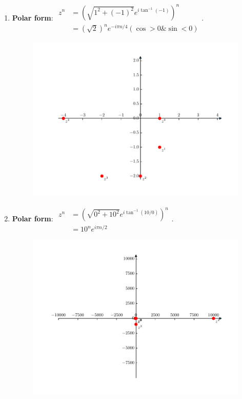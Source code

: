 \begin{homeworkProblem}
\begin{multicols}{2}
\begin{enumerate}
    \item \textbf{Polar form}:
    $\begin{aligned}
        z^n &= (\sqrt{1^2 + (-1)^2} e^{i\tan^{-1}(-1)})^n\\
        &= (\sqrt{2})^n e^{-i\pi n/4} (\cos > 0\& \sin < 0)
    \end{aligned}$.
    \begin{figure}[H]
        \centering
        \includegraphics[scale=0.5]{fig/fig8(b).pdf}
    \end{figure}
    
    \item \textbf{Polar form}:
    $\begin{aligned}
        z^n &= (\sqrt{0^2 + 10^2} e^{i\tan^{-1}(10/0)})^n\\ &= 10^ne^{i\pi n/2}
    \end{aligned}$.
    \begin{figure}[H]
        \centering
        \includegraphics[scale=0.5]{fig/fig8(c).pdf}
    \end{figure}
    

\end{enumerate}
\end{multicols}
\end{homeworkProblem}
